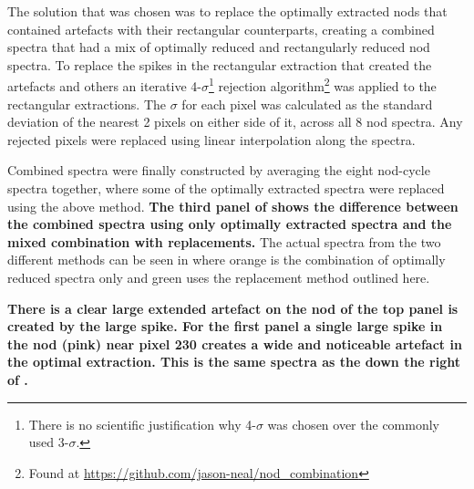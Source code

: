 The solution that was chosen was to replace the optimally extracted nods that contained artefacts with their rectangular counterparts, creating a combined spectra that had a mix of optimally reduced and rectangularly reduced nod spectra.
To replace the spikes in the rectangular extraction that created the artefacts and others an iterative 4-\(\sigma\)\footnote{There is no scientific justification why 4-\(\sigma\) was chosen over the commonly used 3-\(\sigma\).} rejection algorithm\footnote{Found at \url{https://github.com/jason-neal/nod_combination}} was applied to the rectangular extractions.
The \(\sigma\) for each pixel was calculated as the standard deviation of the nearest 2 pixels on either side of it, across all 8 nod spectra.
Any rejected pixels were replaced using linear interpolation along the spectra.


Combined spectra were finally constructed by averaging the eight nod-cycle spectra together, where some of the optimally extracted spectra were replaced using the above method. \textbf{The third panel of  shows the difference between the combined spectra using only optimally extracted spectra and the mixed combination with replacements.} The actual spectra from the two different methods can be seen in  where orange is the combination of optimally reduced spectra only and green uses the replacement method outlined here.


\textbf{There is a clear large extended artefact on the  nod of the top panel is created by the large spike.
For the first panel a single large spike in the  nod (pink) near pixel 230 creates a wide and noticeable artefact in the optimal extraction.
This is the same spectra as the  down the right of .
}

